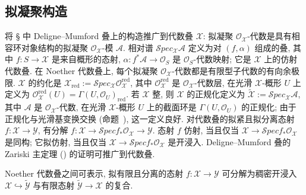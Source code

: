 \subsection{拟凝聚构造}\label{src:7.1.3-subsection}
将 \S{} 中 Deligne--Mumford 叠上的构造推广到代数叠 $\mathcal X$: 拟凝聚 $\mathcal O_{\mathcal X}$-代数是具有相容环对象结构的拟凝聚 $\mathcal O_{\mathcal X}$-模 $\mathcal A$. 相对谱 $\mathcal S\!pec_{\mathcal X}\mathcal A$ 定义为对 $(f,\alpha)$ 组成的叠, 其中 $f:S\to\mathcal X$ 是来自概形的态射, $\alpha:f^*\mathcal A\to\mathcal O_S$ 是 $\mathcal O_S$-代数映射; 它是 $\mathcal X$ 上的仿射代数叠. 在 Noether 代数叠上, 每个拟凝聚 $\mathcal O_{\mathcal X}$-代数都是有限型子代数的有向余极限.
$\mathcal X$ 的约化是 $\mathcal X_{\mathrm{red}}:=\mathcal S\!pec_{\mathcal X}\mathcal O_{\mathcal X}^{\mathrm{red}}$, 其中 $\mathcal O_{\mathcal X}^{\mathrm{red}}$ 是 $\mathcal O_{\mathcal X}$-代数层, 在光滑 $\mathcal X$-概形 $U$ 上定义为 $\mathcal O_{\mathcal X}^{\mathrm{red}}(U)=\Gamma(U,\mathcal O_U)_{\mathrm{red}}$. 若 $\mathcal X$ 整, 则 $\mathcal X$ 的正规化定义为 $\widetilde{\mathcal X}:=\mathcal S\!pec_{\mathcal X}\mathcal A$, 其中 $\mathcal A$ 是 $\mathcal O_{\mathcal X}$-代数, 在光滑 $\mathcal X$-概形 $U$ 上的截面环是 $\Gamma(U,\mathcal O_U)$ 的正规化; 由于正规化与光滑基变换交换 (命题~), 这一定义良好.
对代数叠的拟紧且拟分离态射 $f:\mathcal X\to\mathcal Y$, 有分解 $f:\mathcal X\to\mathcal S\!pec f_*\mathcal O_{\mathcal X}\to\mathcal Y$. 态射 $f$ 仿射, 当且仅当 $\mathcal X\to\mathcal S\!pec f_*\mathcal O_{\mathcal X}$ 是同构; 它拟仿射, 当且仅当 $\mathcal X\to\mathcal S\!pec f_*\mathcal O_{\mathcal X}$ 是开浸入. Deligne--Mumford 叠的 Zariski 主定理 () 的证明可推广到代数叠.
\begin{theorem}\label{src:7.1.17}
Noether 代数叠之间可表示, 拟有限且分离的态射 $f:\mathcal X\to\mathcal Y$ 可分解为稠密开浸入 $\mathcal X\hookrightarrow\widetilde{\mathcal Y}$ 与有限态射 $\widetilde{\mathcal Y}\to\mathcal X$ 的复合.
\end{theorem}
